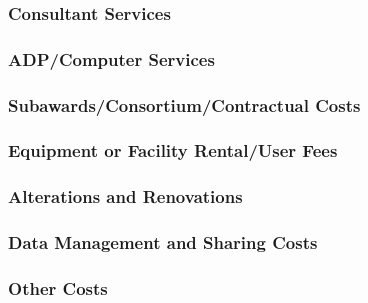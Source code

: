 \lipsum[66]

\subsubsection*{Consultant Services} 

\lipsum[66]

\subsubsection*{ADP/Computer Services} 

\lipsum[66]

\subsubsection*{Subawards/Consortium/Contractual Costs} 

\lipsum[66]

\subsubsection*{Equipment or Facility Rental/User Fees} 

\lipsum[66]

\subsubsection*{Alterations and Renovations} 

\lipsum[66]
\subsubsection*{Data Management and Sharing Costs} 
 
\lipsum[66]

\subsubsection*{Other Costs} 

\lipsum[66]

